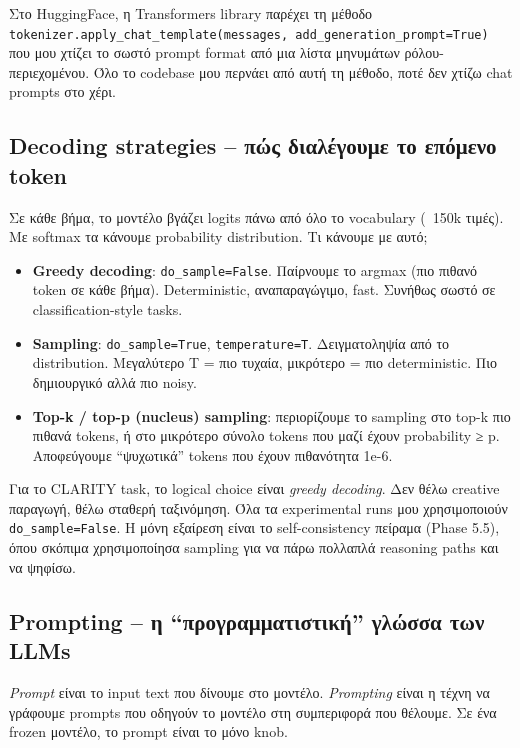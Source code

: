 \documentclass[12pt]{fphw}
\begin{document}
Στο HuggingFace, η Transformers library παρέχει τη μέθοδο \texttt{tokenizer.apply\_chat\_template(messages, add\_generation\_prompt=True)} που μου χτίζει το σωστό prompt format από μια λίστα μηνυμάτων ρόλου-περιεχομένου. Όλο το codebase μου περνάει από αυτή τη μέθοδο, ποτέ δεν χτίζω chat prompts στο χέρι.

\subsection{Decoding strategies -- πώς διαλέγουμε το επόμενο token}

Σε κάθε βήμα, το μοντέλο βγάζει logits πάνω από όλο το vocabulary (~150k τιμές). Με softmax τα κάνουμε probability distribution. Τι κάνουμε με αυτό;

\begin{itemize}
    \item \textbf{Greedy decoding}: \texttt{do\_sample=False}. Παίρνουμε το argmax (πιο πιθανό token σε κάθε βήμα). Deterministic, αναπαραγώγιμο, fast. Συνήθως σωστό σε classification-style tasks.
    \item \textbf{Sampling}: \texttt{do\_sample=True}, \texttt{temperature=T}. Δειγματοληψία από το distribution. Μεγαλύτερο T = πιο τυχαία, μικρότερο = πιο deterministic. Πιο δημιουργικό αλλά πιο noisy.
    \item \textbf{Top-k / top-p (nucleus) sampling}: περιορίζουμε το sampling στο top-k πιο πιθανά tokens, ή στο μικρότερο σύνολο tokens που μαζί έχουν probability ≥ p. Αποφεύγουμε ``ψυχωτικά'' tokens που έχουν πιθανότητα 1e-6.
\end{itemize}

Για το CLARITY task, το logical choice είναι \emph{greedy decoding}. Δεν θέλω creative παραγωγή, θέλω σταθερή ταξινόμηση. Όλα τα experimental runs μου χρησιμοποιούν \texttt{do\_sample=False}. Η μόνη εξαίρεση είναι το self-consistency πείραμα (Phase 5.5), όπου σκόπιμα χρησιμοποίησα sampling για να πάρω πολλαπλά reasoning paths και να ψηφίσω.

\subsection{Prompting -- η ``προγραμματιστική'' γλώσσα των LLMs}

\emph{Prompt} είναι το input text που δίνουμε στο μοντέλο. \emph{Prompting} είναι η τέχνη να γράφουμε prompts που οδηγούν το μοντέλο στη συμπεριφορά που θέλουμε. Σε ένα frozen μοντέλο, το prompt είναι το μόνο knob.
\end{document}
